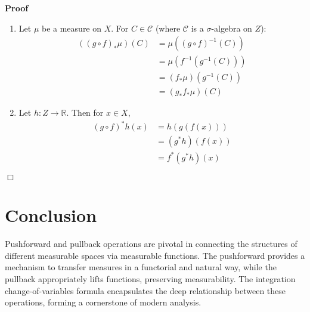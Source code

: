 \documentclass{article}
\newenvironment{proof}{\noindent\textbf{Proof\ }}{\hspace*{\fill}$\Box$\medskip}
\begin{document}
\begin{proof}
  
  \begin{enumerate}
    \item Let $\mu$ be a measure on $X$. For $C \in \mathcal{C}$ (where
    $\mathcal{C}$ is a $\sigma$-algebra on $Z$):
    \begin{equation}
      \begin{array}{ll}
        ((g \circ f)_{\ast} \mu) (C) & = \mu ((g \circ f)^{- 1} (C))\\
        & = \mu (f^{- 1} (g^{- 1} (C)))\\
        & = (f_{\ast} \mu) (g^{- 1} (C))\\
        & = (g_{\ast} f_{\ast} \mu) (C)
      \end{array}
    \end{equation}
    \item Let $h : Z \to \mathbb{R}$. Then for $x \in X$,
    \begin{equation}
      \begin{array}{ll}
        (g \circ f)^{\ast} h (x) & = h (g (f (x)))\\
        & = (g^{\ast} h) (f (x))\\
        & = f^{\ast}  (g^{\ast} h) (x)
      \end{array}
    \end{equation}
  \end{enumerate}
\end{proof}

\section{Conclusion}

Pushforward and pullback operations are pivotal in connecting the structures
of different measurable spaces via measurable functions. The pushforward
provides a mechanism to transfer measures in a functorial and natural way,
while the pullback appropriately lifts functions, preserving measurability.
The integration change-of-variables formula encapsulates the deep relationship
between these operations, forming a cornerstone of modern analysis.
\end{document}
